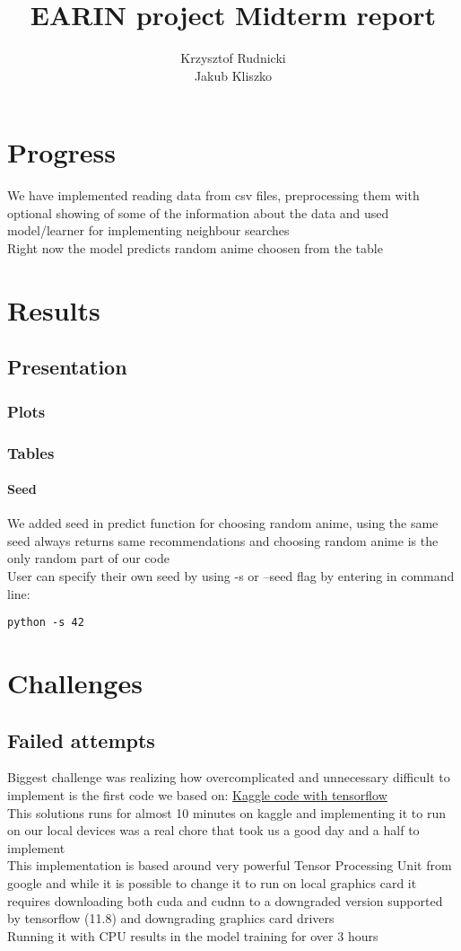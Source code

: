 \documentclass[12pt]{article}
\title{EARIN project Midterm report}
\author{Krzysztof Rudnicki \\ Jakub Kliszko}
\begin{document}
\maketitle
\section{Progress}
We have implemented reading data from csv files, preprocessing them with optional showing of some of the information about the data and used model/learner for implementing neighbour searches \\ 
Right now the model predicts random anime choosen from the table  
\section{Results}
\subsection{Presentation}
\subsubsection{Plots}
\subsubsection{Tables}
\paragraph{Seed} We added seed in predict function for choosing random anime, using the same seed always returns same recommendations and choosing random anime is the only random part of our code \\ 
User can specify their own seed by using -s or --seed flag by entering in command line:
\begin{lstlisting}
python -s 42
\end{lstlisting}
\section{Challenges}
\subsection{Failed attempts}
Biggest challenge was realizing how overcomplicated and unnecessary difficult to implement is the first code we based on: \href{https://www.kaggle.com/code/chaitanya99/recommendation-system-cf-anime}{Kaggle code with tensorflow} \\ 
This solutions runs for almost 10 minutes on kaggle and implementing it to run on our local devices was a real chore that took us a good day and a half to implement \\
This implementation is based around very powerful Tensor Processing Unit from google and while it is possible to change it to run on local graphics card it requires downloading both cuda and cudnn to a downgraded version supported by tensorflow (11.8) and downgrading graphics card drivers \\ 
Running it with CPU results in the model training for over 3 hours 
\end{document}
